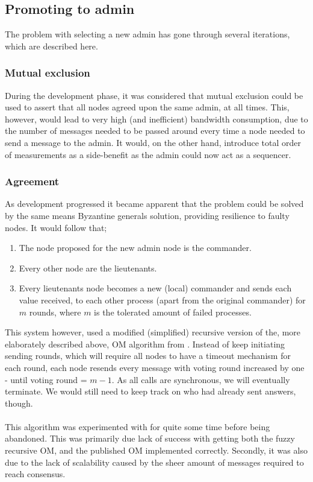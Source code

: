 \documentclass[10pt,a4paper]{article}
\begin{document}
\subsection{Promoting to admin}
\label{sec:admin_promotion}
The problem with selecting a new admin has gone through several iterations, which are described here.
\subsubsection{Mutual exclusion}
During the development phase, it was considered that mutual exclusion could be used to assert that all nodes agreed upon the same admin, at all times. This, however, would lead to very high (and inefficient) bandwidth consumption, due to the number of messages needed to be passed around every time a node needed to send a message to the admin. It would, on the other hand, introduce total order of measurements as a side-benefit as the admin could now act as a sequencer.

\subsubsection{Agreement}
As development progressed it became apparent that the problem could be solved by the same means Byzantine generals solution, providing resilience to faulty nodes. It would follow that;
\begin{enumerate}
\item The node proposed for the new admin node is the commander.
\item Every other node are the lieutenants.
\item Every lieutenants node becomes a new (local) commander and sends each value received, to each other process (apart from the original commander) for $m$ rounds, where $m$ is the tolerated amount of failed processes.
\end{enumerate}
This system however, used a modified (simplified) recursive version of the, more elaborately described above, OM algorithm from \cite{lamport1982byzantine}. Instead of keep initiating sending rounds, which will require all nodes to have a timeout mechanism for each round, each node resends every message with voting round increased by one - until voting round = $m-1$. As all calls are synchronous, we will eventually terminate. We would still need to keep track on who had already sent answers, though.\\\\
This algorithm was experimented with for quite some time before being abandoned. This was primarily due lack of success with getting both the fuzzy recursive OM, and the published OM implemented correctly. Secondly, it was also due to the lack of scalability caused by the sheer amount of messages required to reach consensus.
\end{document}

